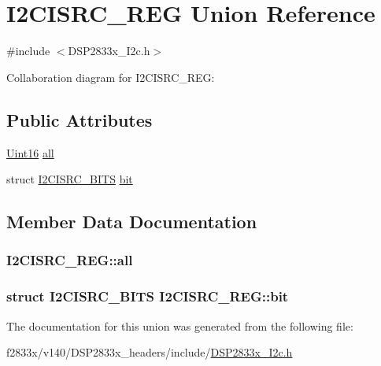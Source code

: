 \hypertarget{union_i2_c_i_s_r_c___r_e_g}{}\section{I2\+C\+I\+S\+R\+C\+\_\+\+R\+E\+G Union Reference}
\label{union_i2_c_i_s_r_c___r_e_g}


{\ttfamily \#include $<$D\+S\+P2833x\+\_\+\+I2c.\+h$>$}



Collaboration diagram for I2\+C\+I\+S\+R\+C\+\_\+\+R\+E\+G\+:
\subsection*{Public Attributes}
\begin{DoxyCompactItemize}
\item 
\hyperlink{_d_s_p2833x___device_8h_a59a9f6be4562c327cbfb4f7e8e18f08b}{Uint16} \hyperlink{union_i2_c_i_s_r_c___r_e_g_a1a4e787f8f31300f9bf1be1b2880d20a}{all}
\item 
struct \hyperlink{struct_i2_c_i_s_r_c___b_i_t_s}{I2\+C\+I\+S\+R\+C\+\_\+\+B\+I\+T\+S} \hyperlink{union_i2_c_i_s_r_c___r_e_g_af4176827ca166b52668b93aee06bbfcc}{bit}
\end{DoxyCompactItemize}


\subsection{Member Data Documentation}
\hypertarget{union_i2_c_i_s_r_c___r_e_g_a1a4e787f8f31300f9bf1be1b2880d20a}{}
\subsubsection[{all}]{ I2\+C\+I\+S\+R\+C\+\_\+\+R\+E\+G\+::all}\label{union_i2_c_i_s_r_c___r_e_g_a1a4e787f8f31300f9bf1be1b2880d20a}
\hypertarget{union_i2_c_i_s_r_c___r_e_g_af4176827ca166b52668b93aee06bbfcc}{}
\subsubsection[{bit}]{\setlength{\rightskip}{0pt plus 5cm}struct {\bf I2\+C\+I\+S\+R\+C\+\_\+\+B\+I\+T\+S} I2\+C\+I\+S\+R\+C\+\_\+\+R\+E\+G\+::bit}\label{union_i2_c_i_s_r_c___r_e_g_af4176827ca166b52668b93aee06bbfcc}


The documentation for this union was generated from the following file\+:\begin{DoxyCompactItemize}
\item 
f2833x/v140/\+D\+S\+P2833x\+\_\+headers/include/\hyperlink{_d_s_p2833x___i2c_8h}{D\+S\+P2833x\+\_\+\+I2c.\+h}\end{DoxyCompactItemize}
